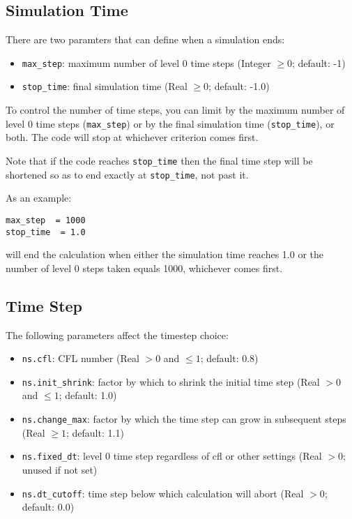\subsection{Simulation Time}

There are two paramters that can define when a simulation ends:
\begin{itemize}
\item {\tt max\_step}: maximum number of level 0 time steps (Integer $\geq 0$; default: -1)
\item {\tt stop\_time}: final simulation time (Real $\geq 0$;  default: -1.0)
\end{itemize}
To control the number of time steps, you can limit by the maximum
number of level 0 time steps ({\tt max\_step}) or by the final
simulation time ({\tt stop\_time}), or both. The code will stop at
whichever criterion comes first.

Note that if the code reaches {\tt stop\_time} then the final time
step will be shortened so as to end exactly at {\tt stop\_time}, not
past it.

As an example: 
\begin{lstlisting}
max_step  = 1000
stop_time  = 1.0
\end{lstlisting}
will end the calculation when either the simulation time reaches 1.0 or 
the number of level 0 steps taken equals 1000, whichever comes first.


\subsection{Time Step}

The following parameters affect the timestep choice:
\begin{itemize}
\item {\tt ns.cfl}: CFL number (Real $> 0$ and $\leq 1$; default: 0.8)

\item {\tt ns.init\_shrink}: factor by which to shrink the initial
   time step (Real $> 0$ and $\leq 1$; default: 1.0)

\item {\tt ns.change\_max}: factor by which the time step can grow in
   subsequent steps (Real $\geq 1$; default: 1.1)

\item {\tt ns.fixed\_dt}: level 0 time step regardless of cfl or other settings
   (Real $> 0$; unused if not set)

\item {\tt ns.dt\_cutoff}: time step below which calculation will abort
   (Real $> 0$; default: 0.0)

\end{itemize}

